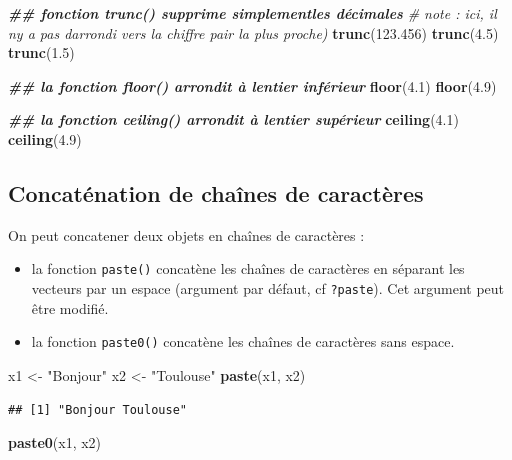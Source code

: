 \documentclass[
]{book}
\newenvironment{Shaded}{\begin{snugshade}}{\end{snugshade}}
\newcommand{\CommentTok}[1]{\textcolor[rgb]{0.56,0.35,0.01}{\textit{#1}}}
\newcommand{\DocumentationTok}[1]{\textcolor[rgb]{0.56,0.35,0.01}{\textbf{\textit{#1}}}}
\newcommand{\FloatTok}[1]{\textcolor[rgb]{0.00,0.00,0.81}{#1}}
\newcommand{\FunctionTok}[1]{\textcolor[rgb]{0.13,0.29,0.53}{\textbf{#1}}}
\newcommand{\NormalTok}[1]{#1}
\newcommand{\OtherTok}[1]{\textcolor[rgb]{0.56,0.35,0.01}{#1}}
\newcommand{\StringTok}[1]{\textcolor[rgb]{0.31,0.60,0.02}{#1}}
\providecommand{\tightlist}{%
  \setlength{\itemsep}{0pt}\setlength{\parskip}{0pt}}
\begin{document}
\begin{Shaded}
\begin{Highlighting}[]
\DocumentationTok{\#\# fonction trunc() supprime simplementles décimales}
\CommentTok{\# note : ici, il n\textquotesingle{}y a pas d\textquotesingle{}arrondi vers la chiffre pair la plus proche)}
\FunctionTok{trunc}\NormalTok{(}\FloatTok{123.456}\NormalTok{)}
\FunctionTok{trunc}\NormalTok{(}\FloatTok{4.5}\NormalTok{)}
\FunctionTok{trunc}\NormalTok{(}\FloatTok{1.5}\NormalTok{)}

\DocumentationTok{\#\# la fonction floor() arrondit à l\textquotesingle{}entier inférieur}
\FunctionTok{floor}\NormalTok{(}\FloatTok{4.1}\NormalTok{)}
\FunctionTok{floor}\NormalTok{(}\FloatTok{4.9}\NormalTok{)}

\DocumentationTok{\#\# la fonction ceiling() arrondit à l\textquotesingle{}entier supérieur}
\FunctionTok{ceiling}\NormalTok{(}\FloatTok{4.1}\NormalTok{)}
\FunctionTok{ceiling}\NormalTok{(}\FloatTok{4.9}\NormalTok{)}
\end{Highlighting}
\end{Shaded}

\subsection{Concaténation de chaînes de caractères}\label{concatuxe9nation-de-chauxeenes-de-caractuxe8res}

On peut concatener deux objets en chaînes de caractères :

\begin{itemize}
\tightlist
\item
  la fonction \texttt{paste()} concatène les chaînes de caractères en séparant les vecteurs par un espace (argument par défaut, cf \texttt{?paste}). Cet argument peut être modifié.
\item
  la fonction \texttt{paste0()} concatène les chaînes de caractères sans espace.
\end{itemize}

\begin{Shaded}
\begin{Highlighting}[]
\NormalTok{x1 }\OtherTok{\textless{}{-}} \StringTok{"Bonjour"}
\NormalTok{x2 }\OtherTok{\textless{}{-}} \StringTok{"Toulouse"}
\FunctionTok{paste}\NormalTok{(x1, x2)}
\end{Highlighting}
\end{Shaded}

\begin{verbatim}
## [1] "Bonjour Toulouse"
\end{verbatim}

\begin{Shaded}
\begin{Highlighting}[]
\FunctionTok{paste0}\NormalTok{(x1, x2)}
\end{Highlighting}
\end{Shaded}
\end{document}
